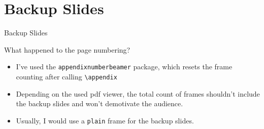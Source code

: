 \documentclass[aspectratio=169]{beamer}                    %
\begin{document}
\section*{Backup Slides}
\begin{frame}
	\centering
	\vfill
	{\fontsize{40}{50}\selectfont Backup Slides}
	\vfill
\end{frame}

\begin{frame}{What happened to the page numbering?}
	\begin{itemize}
		\item I've used the \texttt{appendixnumberbeamer}
		      package, which resets the frame counting after calling
		      \texttt{\textbackslash{}appendix}
		\item Depending on the used pdf viewer, the total
		      count of frames shouldn't include the backup slides and
		      won't demotivate the audience.
		\item Usually, I would use a \texttt{plain} frame
		      for the backup slides.
	\end{itemize}
\end{frame}
\end{document}
